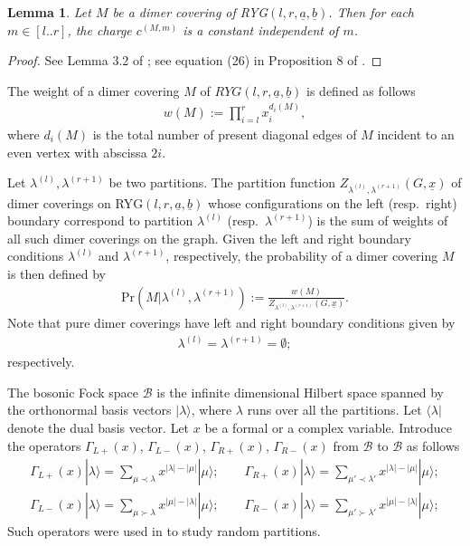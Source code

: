 \documentclass[11pt]{amsart}
\theoremstyle{plain}
\newtheorem{lemma}[theorem]{Lemma}
\theoremstyle{definition}
\theoremstyle{remark}
\numberwithin{equation}{section}
\numberwithin{theorem}{section}
\numberwithin{figure}{section}
\begin{document}
\begin{lemma}Let $M$ be a dimer covering of RYG$(l,r,\underline{a},\underline{b})$. Then for each $m\in [l..r]$, the charge $c^{(M,m)}$ is a constant independent of $m$.
\end{lemma}

\begin{proof}See Lemma 3.2 of \cite{ZL22}; see equation (26) in Proposition 8 of \cite{bbccr}.
\end{proof}

The weight of a dimer covering $M$ of $RYG(l,r,\underline{a},\underline{b})$ is defined as follows
\begin{eqnarray*}
w(M):=\prod_{i=l}^{r}x_i^{d_i(M)},
\end{eqnarray*}
where $d_i(M)$ is the total number of present diagonal edges of $M$ incident to an even vertex with abscissa $2i$. 

Let $\lambda^{(l)},\lambda^{(r+1)}$ be two partitions. The partition function $Z_{\lambda^{(l)},\lambda^{(r+1)}}(G,\underline{x})$ of dimer coverings on RYG$(l,r,\underline{a},\underline{b})$ whose configurations on the left (resp.\ right) boundary correspond to partition $\lambda^{(l)}$ (resp.\ $\lambda^{(r+1)}$) is the sum of weights of all such dimer coverings on the graph. Given the left and right boundary conditions $\lambda^{(l)}$ and $\lambda^{(r+1)}$, respectively, the probability of a dimer covering $M$ is then defined by
\begin{eqnarray}
\mathrm{Pr}(M|\lambda^{(l)},\lambda^{(r+1)}):=\frac{w(M)}{Z_{\lambda^{(l)},\lambda^{(r+1)}}(G,\underline{x})}.\label{ppd}
\end{eqnarray}
Note that pure dimer coverings have left and right boundary conditions given by
\begin{eqnarray}
\lambda^{(l)}=\lambda^{(r+1)}=\emptyset;\label{pbc}
\end{eqnarray}
respectively.

The bosonic Fock space $\mathcal{B}$ is the infinite dimensional Hilbert space spanned by the orthonormal basis vectors $|\lambda\rangle$, where $\lambda$ runs over all the partitions. Let $\langle \lambda |$ denote the dual basis vector. Let $x$ be a formal or a complex variable. Introduce the operators $\Gamma_{L+}(x)$, $\Gamma_{L-}(x)$, $\Gamma_{R+}(x)$, $\Gamma_{R-}(x)$ from $\mathcal{B}$  to $\mathcal{B}$ as follows
\begin{eqnarray*}
\Gamma_{L+}(x)|\lambda\rangle=\sum_{\mu\prec \lambda}x^{|\lambda|-|\mu|}|\mu\rangle;\qquad \Gamma_{R+}(x)|\lambda\rangle=\sum_{\mu'\prec \lambda'}x^{|\lambda|-|\mu|}|\mu\rangle;\\
\Gamma_{L-}(x)|\lambda\rangle=\sum_{\mu\succ \lambda}x^{|\mu|-|\lambda|}|\mu\rangle;\qquad \Gamma_{R-}(x)|\lambda\rangle=\sum_{\mu'\succ \lambda'}x^{|\mu|-|\lambda|}|\mu\rangle;
\end{eqnarray*}
Such operators were used in \cite{oko01} to study random partitions.
\end{document}
